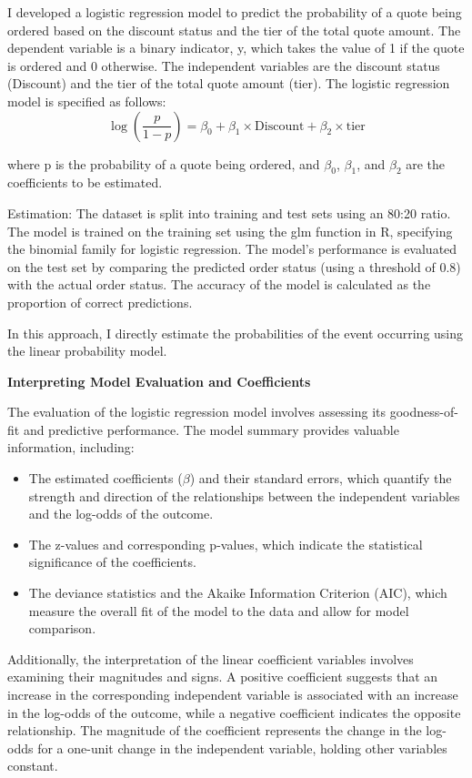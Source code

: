 \documentclass[12pt,english]{article}
\begin{document}
I developed a logistic regression model to predict the probability of a quote being ordered based on the discount status and the tier of the total quote amount. The dependent variable is a binary indicator, y, which takes the value of 1 if the quote is ordered and 0 otherwise. The independent variables are the discount status (Discount) and the tier of the total quote amount (tier).
The logistic regression model is specified as follows:
\[
\log\left(\frac{p}{1-p}\right) = \beta_0 + \beta_1 \times \text{Discount} + \beta_2 \times \text{tier}
\]

where p is the probability of a quote being ordered, and $\beta_0$, $\beta_1$, and $\beta_2$ are the coefficients to be estimated.

Estimation:
The dataset is split into training and test sets using an 80:20 ratio. The model is trained on the training set using the glm function in R, specifying the binomial family for logistic regression. The model's performance is evaluated on the test set by comparing the predicted order status (using a threshold of 0.8) with the actual order status. The accuracy of the model is calculated as the proportion of correct predictions.

In this approach, I directly estimate the probabilities of the event occurring using the linear probability model. 

\textbf{{Interpreting Model Evaluation and Coefficients}}

The evaluation of the logistic regression model involves assessing its goodness-of-fit and predictive performance. The model summary provides valuable information, including:
\begin{itemize}
  \item The estimated coefficients ($\beta$) and their standard errors, which quantify the strength and direction of the relationships between the independent variables and the log-odds of the outcome.
  \item The z-values and corresponding p-values, which indicate the statistical significance of the coefficients.
  \item The deviance statistics and the Akaike Information Criterion (AIC), which measure the overall fit of the model to the data and allow for model comparison.
\end{itemize}

Additionally, the interpretation of the linear coefficient variables involves examining their magnitudes and signs. A positive coefficient suggests that an increase in the corresponding independent variable is associated with an increase in the log-odds of the outcome, while a negative coefficient indicates the opposite relationship. The magnitude of the coefficient represents the change in the log-odds for a one-unit change in the independent variable, holding other variables constant.
\end{document}
